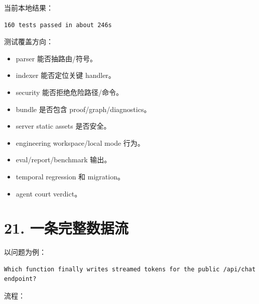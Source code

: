 \documentclass[UTF8,12pt,openany]{ctexbook}
\begin{document}
当前本地结果：\par

\begin{lstlisting}
160 tests passed in about 246s
\end{lstlisting}

测试覆盖方向：\par

\begin{itemize}
\item parser 能否抽路由/符号。
\item indexer 能否定位关键 handler。
\item security 能否拒绝危险路径/命令。
\item bundle 是否包含 proof/graph/diagnostics。
\item server static assets 是否安全。
\item engineering workspace/local mode 行为。
\item eval/report/benchmark 输出。
\item temporal regression 和 migration。
\item agent court verdict。
\end{itemize}

\section{21. 一条完整数据流}

以问题为例：\par

\begin{lstlisting}
Which function finally writes streamed tokens for the public /api/chat endpoint?
\end{lstlisting}

流程：\par
\end{document}
